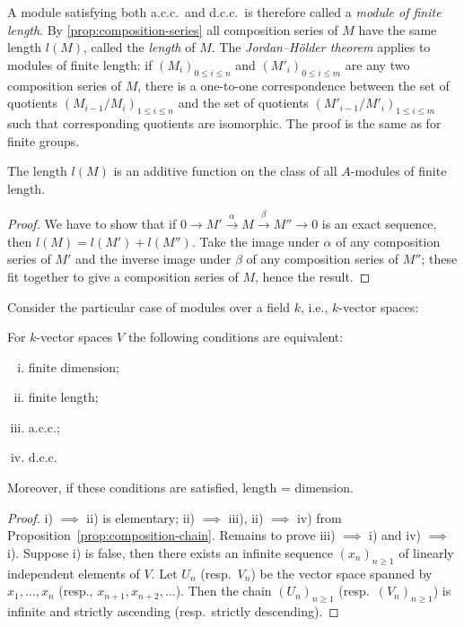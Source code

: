A module satisfying both a.c.c.\ and d.c.c.\ is therefore called a \emph{module of finite length}. By \eqref{prop:composition-series} all composition series of $M$ have the same length $l(M)$, called the \emph{length} of $M$. The \emph{Jordan--H\"older theorem} applies to modules of finite length: if $(M_i)_{0 \leq i \leq n}$ and $(M'_i)_{0 \leq i \leq m}$ are any two composition series of $M$, there is a one-to-one correspondence between the set of quotients $(M_{i-1}/M_i)_{1 \leq i \leq n}$ and the set of quotients $(M'_{i-1}/M'_i)_{1 \leq i \leq m}$ such that corresponding quotients are isomorphic. The proof is the same as for finite groups.

\begin{proposition}\label{prop:length-additive}
The length $l(M)$ is an additive function on the class of all $A$-modules of finite length.
\end{proposition}

\begin{proof}
We have to show that if $0 \longrightarrow M' \stackrel{\alpha}{\longrightarrow} M \stackrel{\beta}{\longrightarrow} M'' \longrightarrow 0$ is an exact sequence, then $l(M) = l(M') + l(M'')$. Take the image under $\alpha$ of any composition series of $M'$ and the inverse image under $\beta$ of any composition series of $M''$; these fit together to give a composition series of $M$, hence the result.
\end{proof}

Consider the particular case of modules over a field $k$, i.e., $k$-vector spaces:

\begin{proposition}\label{prop:vector-space}
For $k$-vector spaces $V$ the following conditions are equivalent:
\begin{enumerate}[i)]
    \item finite dimension;
    \item finite length;
    \item a.c.c.;
    \item d.c.c.
\end{enumerate}
Moreover, if these conditions are satisfied, length = dimension.
\end{proposition}

\begin{proof}
i) $\implies$ ii) is elementary; ii) $\implies$ iii), ii) $\implies$ iv) from Proposition~\ref{prop:composition-chain}. Remains to prove iii) $\implies$ i) and iv) $\implies$ i). Suppose i) is false, then there exists an infinite sequence $(x_n)_{n \geq 1}$ of linearly independent elements of $V$. Let $U_n$ (resp.\ $V_n$) be the vector space spanned by $x_1, \ldots, x_n$ (resp., $x_{n+1}, x_{n+2}, \ldots$). Then the chain $(U_n)_{n \geq 1}$ (resp.\ $(V_n)_{n \geq 1}$) is infinite and strictly ascending (resp.\ strictly descending).
\end{proof}

